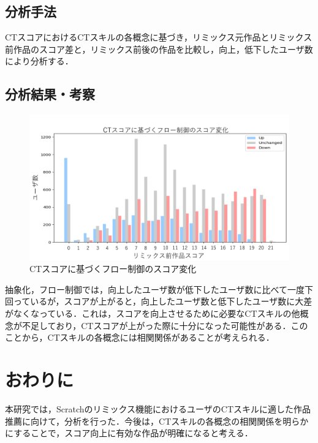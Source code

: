\documentclass[twocolumn]{jarticle} %
\begin{document}
\subsection{分析手法}
CTスコアにおけるCTスキルの各概念に基づき，リミックス元作品とリミックス前作品のスコア差と，リミックス前後の作品を比較し，向上，低下したユーザ数により分析する．
\subsection{分析結果・考察}
\begin{figure}[h]
\centerline{\includegraphics[width=0.8\linewidth]{@BSthesis2024_Horio/BSthesis2024_Horio_fig/resume_rq3.pdf}}
\caption{CTスコアに基づくフロー制御のスコア変化}
\label{fig:}
\end{figure}
抽象化，フロー制御では，向上したユーザ数が低下したユーザ数に比べて一度下回っているが，スコアが上がると，向上したユーザ数と低下したユーザ数に大差がなくなっている．これは，スコアを向上させるために必要なCTスキルの他概念が不足しており，CTスコアが上がった際に十分になった可能性がある．このことから，CTスキルの各概念には相関関係があることが考えられる．

\section{おわりに}
本研究では，Scratchのリミックス機能におけるユーザのCTスキルに適した作品推薦に向けて，分析を行った．今後は，CTスキルの各概念の相関関係を明らかにすることで，スコア向上に有効な作品が明確になると考える．







\end{document}
